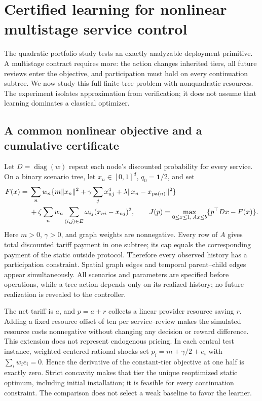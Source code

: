 \section{Certified learning for nonlinear multistage service control}\label{sec:r10-nonlinear}
The quadratic portfolio study tests an exactly analyzable deployment primitive. A multistage contract requires more: the action changes inherited tiers, all future reviews enter the objective, and participation must hold on every continuation subtree. We now study this full finite-tree problem with nonquadratic resources. The experiment isolates approximation from verification; it does not assume that learning dominates a classical optimizer.

\subsection{A common nonlinear objective and a cumulative certificate}
Let $D=\operatorname{diag}(w)$ repeat each node's discounted probability for every service. On a binary scenario tree, let $x_n\in[0,1]^d$, $q_0=\mathbf1/2$, and set
\begin{align}\label{eq:r10-quartic}
 F(x)={}&\sum_n w_n\{m\|x_n\|^2+\gamma\sum_j x_{nj}^4
                  +\lambda\|x_n-x_{\mathrm{pa}(n)}\|^2\}\notag\\
       &+\zeta\sum_n w_n\sum_{(i,j)\in E}\omega_{ij}(x_{ni}-x_{nj})^2,\qquad
 J(p)=\max_{0\leq x\leq1,\,Ax\leq b}\{p^\top Dx-F(x)\}.
\end{align}
Here $m>0$, $\gamma>0$, and graph weights are nonnegative. Every row of $A$ gives total discounted tariff payment in one subtree; its cap equals the corresponding payment of the static outside protocol. Therefore every observed history has a participation constraint. Spatial graph edges and temporal parent--child edges appear simultaneously. All scenarios and parameters are specified before operations, while a tree action depends only on its realized history; no future realization is revealed to the controller.

The net tariff is $a$, and $p=a+r$ collects a linear provider resource saving $r$. Adding a fixed resource offset of ten per service--review makes the simulated resource costs nonnegative without changing any decision or reward difference. This extension does not represent endogenous pricing. In each central test instance, weighted-centered rational shocks set $p_i=m+\gamma/2+e_i$ with $\sum_iw_ie_i=0$. Hence the derivative of the constant-tier objective at one half is exactly zero. Strict concavity makes that tier the unique reoptimized static optimum, including initial installation; it is feasible for every continuation constraint. The comparison does not select a weak baseline to favor the learner.

